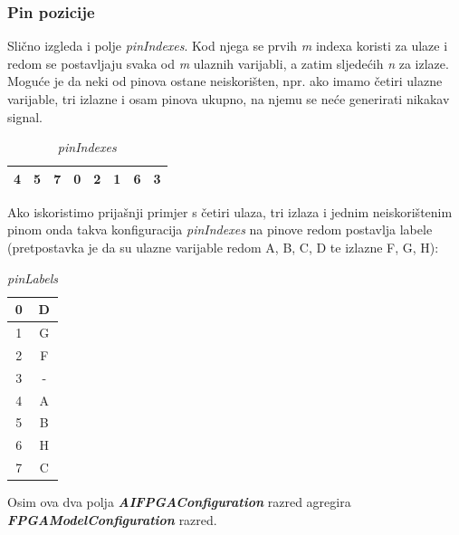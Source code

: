 \documentclass[times, utf8, zavrsni]{fer}
\begin{document}
	\subsubsection{Pin pozicije}
	
	Slično izgleda i polje \emph{pinIndexes}. Kod njega se prvih \emph{m} indexa koristi za ulaze i redom se postavljaju svaka od \emph{m} ulaznih varijabli, a zatim sljedećih \emph{n} za izlaze. Moguće je da neki od pinova ostane neiskorišten, npr. ako imamo četiri ulazne varijable, tri izlazne i osam pinova ukupno, na njemu se neće generirati nikakav signal. 
	
	
	\begin{table}[htb]
		\caption{\emph{pinIndexes}}
		\label{pinIndexes}
		\centering
		\begin{tabular}{|c | c | c | c| c | c | c | c |} \hline
			4 & 5 & 7 & 0 & 2 & 1 & 6 & 3 \\ \hline
		\end{tabular}
	\end{table}
	
	Ako iskoristimo prijašnji primjer s četiri ulaza, tri izlaza i jednim neiskorištenim pinom onda takva konfiguracija \emph{pinIndexes} na pinove redom postavlja labele (pretpostavka je da su ulazne varijable redom A, B, C, D te izlazne F, G, H):
	
	\begin{table}[htb]
		\caption{\emph{pinLabels}}
		\label{pinLabels}
		\centering
		\begin{tabular}{|c | c |} \hline
			0 & D \\ \hline
			1 & G \\ \hline
			2 & F \\ \hline
			3 & - \\ \hline
			4 & A \\ \hline
			5 & B \\ \hline
			6 & H \\ \hline
			7 & C \\ \hline
		\end{tabular}
	\end{table}
	
	Osim ova dva polja \textbf{\emph{AIFPGAConfiguration}} razred agregira \textbf{\emph{FPGAModelConfiguration}} razred. 
	
\end{document}
